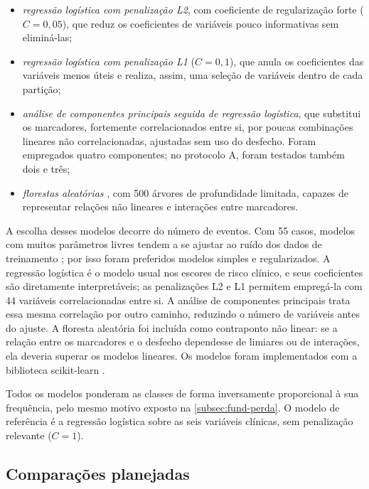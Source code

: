 \begin{itemize}
	\item \textit{regressão logística com penalização L2}, com coeficiente de
	regularização forte ($C = 0{,}05$), que reduz os coeficientes de variáveis
	pouco informativas sem eliminá-las;
	\item \textit{regressão logística com penalização L1} ($C = 0{,}1$), que
	anula os coeficientes das variáveis menos úteis e realiza, assim, uma
	seleção de variáveis dentro de cada partição;
	\item \textit{análise de componentes principais} \textit{seguida de regressão
	logística}, que substitui os marcadores, fortemente correlacionados entre
	si, por poucas combinações lineares não correlacionadas, ajustadas sem
	uso do desfecho. Foram empregados quatro componentes; no protocolo A,
	foram testados também dois e três;
	\item \textit{florestas aleatórias} \cite{breiman2001random}, com 500
	árvores de profundidade limitada, capazes de representar relações não
	lineares e interações entre marcadores.
\end{itemize}

A escolha desses modelos decorre do número de eventos. Com 55 casos, modelos
com muitos parâmetros livres tendem a se ajustar ao ruído dos dados de
treinamento \cite{peduzzi1996simulation}; por isso foram preferidos modelos
simples e regularizados. A regressão logística é o modelo usual nos escores
de risco clínico, e seus coeficientes são diretamente interpretáveis; as
penalizações L2 e L1 permitem empregá-la com 44 variáveis correlacionadas
entre si. A análise de componentes principais trata essa mesma correlação
por outro caminho, reduzindo o número de variáveis antes do ajuste. A
floresta aleatória foi incluída como contraponto não linear: se a relação
entre os marcadores e o desfecho dependesse de limiares ou de interações,
ela deveria superar os modelos lineares. Os modelos foram implementados com
a biblioteca scikit-learn \cite{pedregosa2011scikit}.

\noindent
Todos os modelos ponderam as classes de forma inversamente proporcional à
sua frequência, pelo mesmo motivo exposto na \autoref{subsec:fund-perda}. O
modelo de referência é a regressão logística sobre as seis variáveis
clínicas, sem penalização relevante ($C = 1$).

\subsection{Comparações planejadas}
\label{subsec:met-comparacoes-marcadores}

